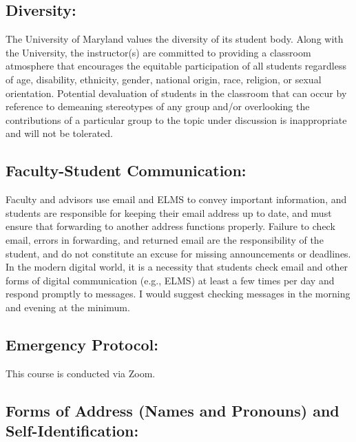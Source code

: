 \documentclass[
]{book}
\begin{document}
\hypertarget{diversity}{%
\subsection{Diversity:}\label{diversity}}

The University of Maryland values the diversity of its student body. Along with the University, the instructor(s) are committed to providing a classroom atmosphere that encourages the equitable participation of all students regardless of age, disability, ethnicity, gender, national origin, race, religion, or sexual orientation. Potential devaluation of students in the classroom that can occur by reference to demeaning stereotypes of any group and/or overlooking the contributions of a particular group to the topic under discussion is inappropriate and will not be tolerated.

\hypertarget{faculty-student-communication-1}{%
\subsection{Faculty-Student Communication:}\label{faculty-student-communication-1}}

Faculty and advisors use email and ELMS to convey important information, and students are responsible for keeping their email address up to date, and must ensure that forwarding to another address functions properly. Failure to check email, errors in forwarding, and returned email are the responsibility of the student, and do not constitute an excuse for missing announcements or deadlines. In the modern digital world, it is a necessity that students check email and other forms of digital communication (e.g., ELMS) at least a few times per day and respond promptly to messages. I would suggest checking messages in the morning and evening at the minimum.

\hypertarget{emergency-protocol-1}{%
\subsection{Emergency Protocol:}\label{emergency-protocol-1}}

This course is conducted via Zoom.

\hypertarget{forms-of-address-names-and-pronouns-and-self-identification}{%
\subsection{Forms of Address (Names and Pronouns) and Self-Identification:}\label{forms-of-address-names-and-pronouns-and-self-identification}}
\end{document}

